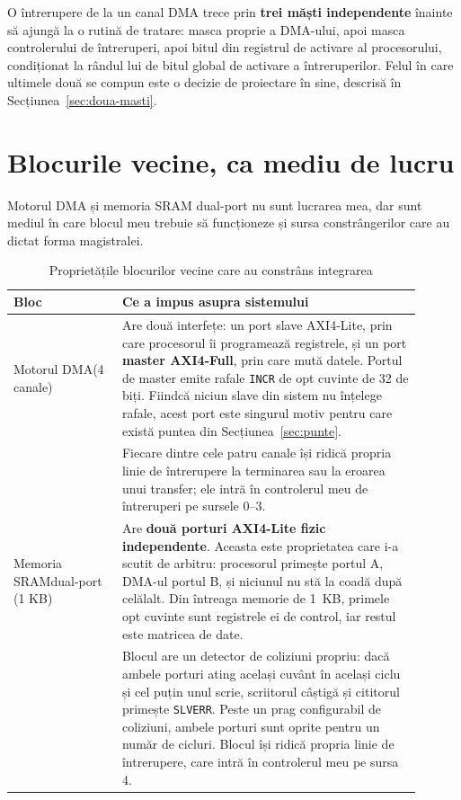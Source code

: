 \documentclass[11pt,openany]{report}
\newcommand{\sig}[1]{\texttt{#1}}
\begin{document}
O întrerupere de la un canal DMA trece prin \textbf{trei măști independente}
înainte să ajungă la o rutină de tratare: masca proprie a DMA-ului, apoi masca
controlerului de întreruperi, apoi bitul din registrul de activare al
procesorului, condiționat la rândul lui de bitul global de activare a
întreruperilor. Felul în care ultimele două se compun este o decizie de
proiectare în sine, descrisă în Secțiunea~\ref{sec:doua-masti}.

\section{Blocurile vecine, ca mediu de lucru}
\label{sec:vecini}

Motorul DMA și memoria SRAM dual-port nu sunt lucrarea mea, dar sunt mediul în
care blocul meu trebuie să funcționeze și sursa constrângerilor care au dictat
forma magistralei.

\begin{table}[H]
\centering
\caption{Proprietățile blocurilor vecine care au constrâns integrarea}
\label{tab:vecini}
\small
\begin{tabular}{@{}L{0.24\linewidth}L{0.66\linewidth}@{}}
\toprule
\textbf{Bloc} & \textbf{Ce a impus asupra sistemului} \\
\midrule
Motorul DMA\newline(4 canale) &
  Are două interfețe: un port slave AXI4-Lite, prin care procesorul îi
  programează registrele, și un port \textbf{master AXI4-Full}, prin care mută
  datele. Portul de master emite rafale \sig{INCR} de opt cuvinte de 32 de biți.
  Fiindcă niciun slave din sistem nu înțelege rafale, acest port este singurul
  motiv pentru care există puntea din Secțiunea~\ref{sec:punte}. \\
\addlinespace
 &
  Fiecare dintre cele patru canale își ridică propria linie de întrerupere la
  terminarea sau la eroarea unui transfer; ele intră în controlerul meu de
  întreruperi pe sursele 0--3. \\
\addlinespace
Memoria SRAM\newline dual-port (1 KB) &
  Are \textbf{două porturi AXI4-Lite fizic independente}. Aceasta este
  proprietatea care i-a scutit de arbitru: procesorul primește portul A, DMA-ul
  portul B, și niciunul nu stă la coadă după celălalt. Din întreaga memorie de
  1~KB, primele opt cuvinte sunt registrele ei de control, iar restul este
  matricea de date. \\
\addlinespace
 &
  Blocul are un detector de coliziuni propriu: dacă ambele porturi ating același
  cuvânt în același ciclu și cel puțin unul scrie, scriitorul câștigă și
  cititorul primește \sig{SLVERR}. Peste un prag configurabil de coliziuni,
  ambele porturi sunt oprite pentru un număr de cicluri. Blocul își ridică
  propria linie de întrerupere, care intră în controlerul meu pe sursa 4. \\
\bottomrule
\end{tabular}
\end{table}
\end{document}
